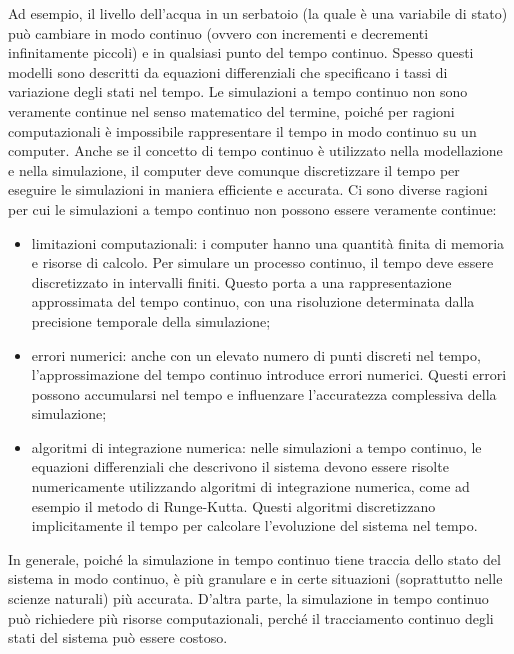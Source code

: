 \documentclass[12pt,a4paper,openright,twoside]{book}
\begin{document}
Ad esempio, il livello dell'acqua in un serbatoio (la quale è una variabile di stato) può cambiare in modo continuo (ovvero con incrementi e decrementi infinitamente piccoli) e in qualsiasi punto del tempo continuo. Spesso questi modelli sono descritti da equazioni differenziali che specificano i tassi di variazione degli stati nel tempo.
Le simulazioni a tempo continuo non sono veramente continue nel senso matematico del termine, poiché per ragioni computazionali è impossibile rappresentare il tempo in modo continuo su un computer. Anche se il concetto di tempo continuo è utilizzato nella modellazione e nella simulazione, il computer deve comunque discretizzare il tempo per eseguire le simulazioni in maniera efficiente e accurata.
Ci sono diverse ragioni per cui le simulazioni a tempo continuo non possono essere veramente continue:
\begin{itemize}
    \item limitazioni computazionali: i computer hanno una quantità finita di memoria e risorse di calcolo. Per simulare un processo continuo, il tempo deve essere discretizzato in intervalli finiti. Questo porta a una rappresentazione approssimata del tempo continuo, con una risoluzione determinata dalla precisione temporale della simulazione;
    \item errori numerici: anche con un elevato numero di punti discreti nel tempo, l'approssimazione del tempo continuo introduce errori numerici. Questi errori possono accumularsi nel tempo e influenzare l'accuratezza complessiva della simulazione;
    \item algoritmi di integrazione numerica: nelle simulazioni a tempo continuo, le equazioni differenziali che descrivono il sistema devono essere risolte numericamente utilizzando algoritmi di integrazione numerica, come ad esempio il metodo di Runge-Kutta. Questi algoritmi discretizzano implicitamente il tempo per calcolare l'evoluzione del sistema nel tempo.
\end{itemize}

In generale, poiché la simulazione in tempo continuo tiene traccia dello stato del sistema in modo continuo, è più granulare e in certe situazioni (soprattutto nelle scienze naturali) più accurata. D'altra parte, la simulazione in tempo continuo può richiedere più risorse computazionali, perché il tracciamento continuo degli stati del sistema può essere costoso.
\end{document}
